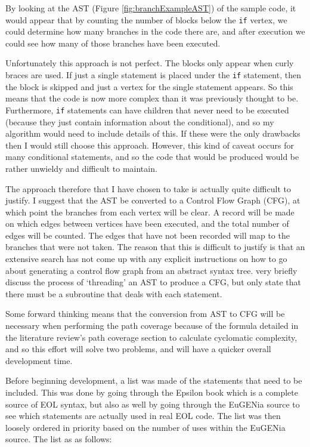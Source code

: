 By looking at the AST (Figure \ref{fig:branchExampleAST}) of the sample code, it would appear that by counting the number of blocks below the \verb|if| vertex, we could determine how many branches in the code there are, and after execution we could see how many of those branches have been executed.

Unfortunately this approach is not perfect. The blocks only appear when curly braces are used. If just a single statement is placed under the \verb|if| statement, then the block is skipped and just a vertex for the single statement appears. So this means that the code is now more complex than it was previously thought to be. Furthermore, \verb|if| statements can have children that never need to be executed (because they just contain information about the conditional), and so my algorithm would need to include details of this. If these were the only drawbacks then I would still choose this approach. However, this kind of caveat occurs for many conditional statements, and so the code that would be produced would be rather unwieldy and difficult to maintain.

The approach therefore that I have chosen to take is actually quite difficult to justify. I suggest that the AST be converted to a Control Flow Graph (CFG), at which point the branches from each vertex will be clear. A record will be made on which edges between vertices have been executed, and the total number of edges will be counted. The edges that have not been recorded will map to the branches that were not taken. The reason that this is difficult to justify is that an extensive search has not come up with any explicit instructions on how to go about generating a control flow graph from an abstract syntax tree.\citet{grune2000modern} very briefly discuss the process of `threading' an AST to produce a CFG, but only state that there must be a subroutine that deals with each statement.

Some forward thinking means that the conversion from AST to CFG will be necessary when performing the path coverage because of the formula detailed in the literature review's path coverage section to calculate cyclomatic complexity, and so this effort will solve two problems, and will have a quicker overall development time.

Before beginning development, a list was made of the statements that need to be included. This was done by going through the Epsilon book \citep{epsilonBook} which is a complete source of EOL syntax, but also as well by going through the EuGENia source to see which statements are actually used in real EOL code. The list was then loosely ordered in priority based on the number of uses within the EuGENia source. The list as as follows:

